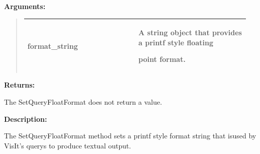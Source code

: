 \documentclass[letterpaper,10pt,english]{sphinxmanual}
\begin{document}
\begin{DUlineblock}{0em}
\item[] 
\item[] \textbf{Arguments:}
\end{DUlineblock}
\begin{quote}

\begin{tabular}{|p{0.475\linewidth}|p{0.475\linewidth}|}
\hline

format\_string
 & 
\begin{DUlineblock}{0em}
\item[] A string object that provides a printf style floating
\item[] point format.
\end{DUlineblock}
\\
\hline\end{tabular}

\end{quote}

\begin{DUlineblock}{0em}
\item[] 
\item[] \textbf{Returns:}
\item[] The SetQueryFloatFormat does not return a value.
\item[] 
\item[] \textbf{Description:}
\item[] The SetQueryFloatFormat method sets a printf style format string that isused by VisIt's querys to produce textual output.
\end{DUlineblock}

\begin{DUlineblock}{0em}
\item[] 
\end{DUlineblock}
\end{document}
